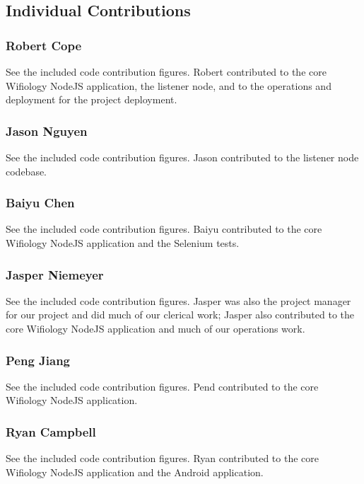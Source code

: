 \documentclass[]{article}
\begin{document}
	\subsection{Individual Contributions}
	\subsubsection{Robert Cope}
	See the included code contribution figures. Robert contributed to the core Wifiology NodeJS application, the
	listener node, and to the operations and deployment for the project deployment.
	
	\subsubsection{Jason Nguyen}
	See the included code contribution figures. Jason contributed to the listener node codebase.	
	
	\subsubsection{Baiyu Chen}
    See the included code contribution figures. Baiyu contributed to the core Wifiology NodeJS application and the 
    Selenium tests.
	
	\subsubsection{Jasper Niemeyer}
    See the included code contribution figures. Jasper was also the project manager for our project and did much
    of our clerical work; Jasper also contributed to the core Wifiology NodeJS application and much of our operations work.
	
	\subsubsection{Peng Jiang}
    See the included code contribution figures. Pend contributed to the core Wifiology NodeJS application.
	
	\subsubsection{Ryan Campbell}
	See the included code contribution figures. Ryan contributed to the core Wifiology NodeJS application and
	the Android application.
	
\end{document}
